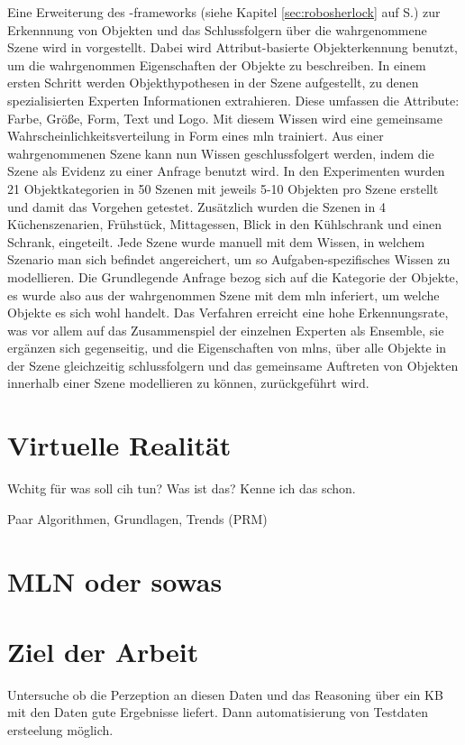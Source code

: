Eine Erweiterung des \robosherlock-\glspl{framework} (siehe Kapitel \ref{sec:robosherlock} auf S.\pageref{sec:robosherlock}) zur Erkennnung von Objekten und das Schlussfolgern über die wahrgenommene Szene wird in \cite{pr2looking} vorgestellt. Dabei wird Attribut-basierte Objekterkennung benutzt, um die wahrgenommen Eigenschaften der Objekte zu beschreiben. In einem ersten Schritt werden Objekthypothesen in der Szene aufgestellt, zu denen spezialisierten Experten Informationen extrahieren. Diese umfassen die Attribute: Farbe, Größe, Form, Text und Logo. Mit diesem Wissen wird eine gemeinsame Wahrscheinlichkeitsverteilung in Form eines \gls{mln} trainiert. Aus einer wahrgenommenen Szene kann nun Wissen geschlussfolgert werden, indem die Szene als Evidenz zu einer Anfrage benutzt wird. In den Experimenten wurden 21 Objektkategorien in 50 Szenen mit jeweils 5-10 Objekten pro Szene erstellt und damit das Vorgehen getestet. Zusätzlich wurden die Szenen in 4 Küchenszenarien, Frühstück, Mittagessen, Blick in den Kühlschrank und einen Schrank, eingeteilt. Jede Szene wurde manuell mit dem Wissen, in welchem Szenario man sich befindet angereichert, um so Aufgaben-spezifisches Wissen zu modellieren. Die Grundlegende Anfrage bezog sich auf die Kategorie der Objekte, es wurde also aus der wahrgenommen Szene mit dem \gls{mln} inferiert, um welche Objekte es sich wohl handelt. Das Verfahren erreicht eine hohe Erkennungsrate, was vor allem auf das Zusammenspiel der einzelnen Experten als Ensemble, sie ergänzen sich gegenseitig, und die Eigenschaften von \glspl{mln}, über alle Objekte in der Szene gleichzeitig schlussfolgern und das gemeinsame Auftreten von Objekten innerhalb einer Szene modellieren zu können, zurückgeführt wird.

\section{Virtuelle Realität}

Wchitg für was soll cih tun? Was ist das? Kenne ich das schon.

Paar Algorithmen, Grundlagen, Trends (PRM) 

\section{MLN oder sowas}

\section{Ziel der Arbeit}
\label{sec:goal}


Untersuche ob die Perzeption an diesen Daten und das Reasoning über ein KB mit den Daten gute Ergebnisse liefert. Dann automatisierung von Testdaten ersteelung möglich. 